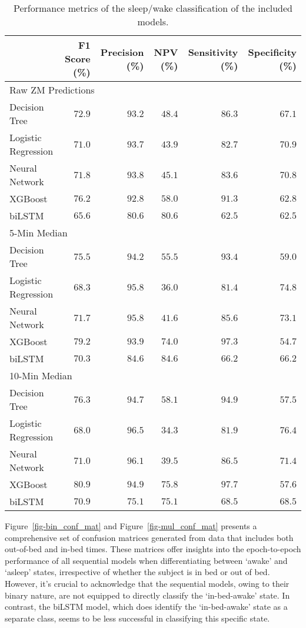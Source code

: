 \documentclass[
  9pt,
]{scrbook}
\begin{document}
\hypertarget{tbl-12}{}
\begin{longtable}{lrrrrr}
\caption{\label{tbl-12}Performance metrics of the sleep/wake classification of the included
models. }\tabularnewline

\toprule
 & F1 Score (\%) & Precision (\%) & NPV (\%) & Sensitivity (\%) & Specificity (\%) \\ 
\midrule
\multicolumn{6}{l}{Raw ZM Predictions} \\ 
\midrule
Decision Tree & $72.9$ & $93.2$ & $48.4$ & $86.3$ & $67.1$ \\ 
Logistic Regression & $71.0$ & $93.7$ & $43.9$ & $82.7$ & $70.9$ \\ 
Neural Network & $71.8$ & $93.8$ & $45.1$ & $83.6$ & $70.8$ \\ 
XGBoost & $76.2$ & $92.8$ & $58.0$ & $91.3$ & $62.8$ \\ 
biLSTM & $65.6$ & $80.6$ & $80.6$ & $62.5$ & $62.5$ \\ 
\midrule
\multicolumn{6}{l}{5-Min Median} \\ 
\midrule
Decision Tree & $75.5$ & $94.2$ & $55.5$ & $93.4$ & $59.0$ \\ 
Logistic Regression & $68.3$ & $95.8$ & $36.0$ & $81.4$ & $74.8$ \\ 
Neural Network & $71.7$ & $95.8$ & $41.6$ & $85.6$ & $73.1$ \\ 
XGBoost & $79.2$ & $93.9$ & $74.0$ & $97.3$ & $54.7$ \\ 
biLSTM & $70.3$ & $84.6$ & $84.6$ & $66.2$ & $66.2$ \\ 
\midrule
\multicolumn{6}{l}{10-Min Median} \\ 
\midrule
Decision Tree & $76.3$ & $94.7$ & $58.1$ & $94.9$ & $57.5$ \\ 
Logistic Regression & $68.0$ & $96.5$ & $34.3$ & $81.9$ & $76.4$ \\ 
Neural Network & $71.0$ & $96.1$ & $39.5$ & $86.5$ & $71.4$ \\ 
XGBoost & $80.9$ & $94.9$ & $75.8$ & $97.7$ & $57.6$ \\ 
biLSTM & $70.9$ & $75.1$ & $75.1$ & $68.5$ & $68.5$ \\ 
\bottomrule
\end{longtable}

\endgroup

Figure~\ref{fig-bin_conf_mat} and Figure~\ref{fig-mul_conf_mat} presents
a comprehensive set of confusion matrices generated from data that
includes both out-of-bed and in-bed times. These matrices offer insights
into the epoch-to-epoch performance of all sequential models when
differentiating between `awake' and `asleep' states, irrespective of
whether the subject is in bed or out of bed. However, it's crucial to
acknowledge that the sequential models, owing to their binary nature,
are not equipped to directly classify the `in-bed-awake' state. In
contrast, the biLSTM model, which does identify the `in-bed-awake' state
as a separate class, seems to be less successful in classifying this
specific state.
\end{document}
